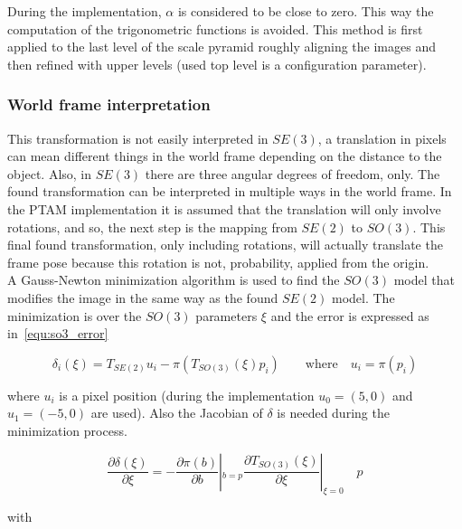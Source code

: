 During the implementation, $\alpha$ is considered to be close to zero. This way the computation of the trigonometric functions is avoided. This method is first applied to the last level of the scale pyramid roughly aligning the images and then refined with upper levels (used top level is a configuration parameter). \\






\subsubsection{World frame interpretation}
\label{ssub:world_frame_interpretation}

This transformation is not easily interpreted in $SE(3)$, a translation in pixels can mean different things in the world frame depending on the distance to the object. Also, in $SE(3)$ there are three angular degrees of freedom, only. The found transformation can be interpreted in multiple ways in the world frame. In the PTAM implementation it is assumed that the translation will only involve rotations, and so, the next step is the mapping from $SE(2)$ to $SO(3)$. This final found transformation, only including rotations, will actually translate the frame pose because this rotation is not, probability, applied from the origin.\\

A Gauss-Newton minimization algorithm is used to find the $SO(3)$ model that modifies the image in the same way as the found $SE(2)$ model. The minimization is over the $SO(3)$ parameters $\xi$ and the error is expressed as in~\ref{equ:so3_error}

\begin{equation}
  \delta_i(\xi) = T_{SE(2)}u_i - \pi(T_{SO(3)}(\xi) p_i) \qquad \text{where} \quad u_i = \pi(p_i)
  \label{equ:so3_error}
\end{equation}


where $u_i$ is a pixel position (during the implementation $u_0=(5,0)$ and $u_1=(-5,0)$ are used). Also the Jacobian of $\delta$ is needed during the minimization process.

\begin{equation}
  \frac{\partial \delta(\xi)}{\partial \xi} = -\frac{\partial \pi (b)}{\partial b}|_{b=p} \frac{\partial T_{SO(3)}(\xi)}{\partial\xi}|_{\xi=0} \quad p
\end{equation}

with

